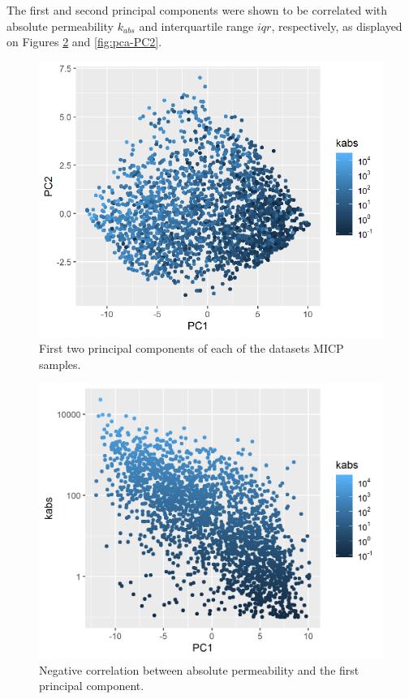 \documentclass[english,msc,numbers]{coppe}
\begin{document}
  The first and second principal components were shown to be correlated with absolute permeability \(k_{abs}\) and interquartile range \(iqr\), respectively, as displayed on Figures \ref{fig:pca-PC1} and \ref{fig:pca-PC2}.
  \begin{figure}[!ht]
  
  {\centering \includegraphics[width=0.75\linewidth]{figure/3-4-pca-features} 
  
  }
  
  \caption{First two principal components of each of the datasets MICP samples.}\label{fig:pca-features}
  \end{figure}
  \begin{figure}
  
  {\centering \includegraphics[width=0.75\linewidth]{figure/3-5-pca-PC1-kabs} 
  
  }
  
  \caption{Negative correlation between absolute permeability and the first principal component.}\label{fig:pca-PC1}
  \end{figure}
\end{document}
